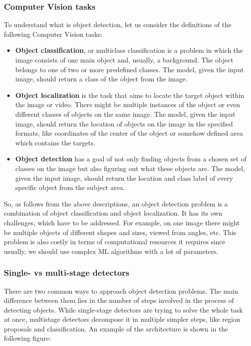 \documentclass[14pt,a4paper]{extarticle}
\newcounter{e}
\numberwithin{equation}{section}
\numberwithin{figure}{section}
\begin{document}
\subsubsection{Computer Vision tasks}
To understand what is object detection, let us consider the definitions of the following Computer Vision tasks:
\begin{itemize}
    \item \textbf{Object classification}, or multiclass classification is a problem in which the image consists of one main object and, usually, a background. The object belongs to one of two or more predefined classes. The model, given the input image, should return a class of the object from the image.
    
    \item \textbf{Object localization} is the task that aims to locate the target object within the image or video. There might be multiple instances of the object or even different classes of objects on the same image. The model, given the input image, should return the location of objects on the image in the specified formats, like coordinates of the center of the object or somehow defined area which contains the targets.
    
    \item \textbf{Object detection} has a goal of not only finding objects from a chosen set of classes on the image but also figuring out what these objects are. The model, given the input image, should return the location and class label of every specific object from the subject area.
\end{itemize}

So, as follows from the above descriptions, an object detection problem is a combination of object classification and object localization. It has its own challenges, which have to be addressed. For example, on one image there might be multiple objects of different shapes and sizes, viewed from angles, etc. This problem is also costly in terms of computational resources it requires since usually, we should use complex ML algorithms with a lot of parameters.


\subsubsection{Single- vs multi-stage detectors}
There are two common ways to approach object detection problems. The main difference between them lies in the number of steps involved in the process of detecting objects. While single-stage detectors are trying to solve the whole task at once, multistage detectors decompose it in multiple simpler steps, like region proposals and classification. An example of the architecture is shown in the following figure:
\end{document}

